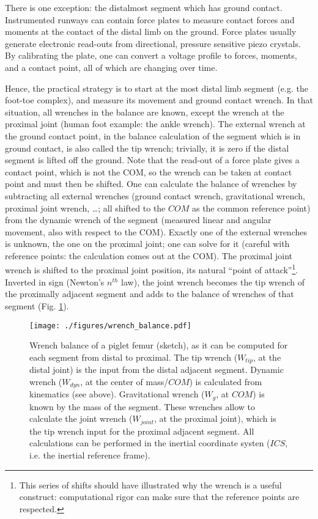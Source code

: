 There is one exception: the distalmost segment which has ground contact.
Instrumented runways can contain force plates to measure contact forces and moments at the contact of the distal limb on the ground.
Force plates usually generate electronic read-outs from directional, pressure sensitive piezo crystals.
By calibrating the plate, one can convert a voltage profile to forces, moments, and a contact point, all of which are changing over time.


Hence, the practical strategy \citep{Robertson2013,Lynch2017,Dumas2004} is to start at the most distal limb segment (e.g. the foot-toe complex), and measure its movement and ground contact wrench.
In that situation, all wrenches in the balance are known, except the wrench at the proximal joint (human foot example: the ankle wrench).
The external wrench at the ground contact point, in the balance calculation of the segment which is in ground contact, is also called the tip wrench; trivially, it is zero if the distal segment is lifted off the ground.
Note that the read-out of a force plate gives a contact point, which is not the COM, so the wrench can be taken at contact point and must then be shifted.
One can calculate the balance of wrenches by subtracting all external wrenches (ground contact wrench, gravitational wrench, proximal joint wrench, \ldots{}; all shifted to the \(COM\) as the common reference point) from the dynamic wrench of the segment (measured linear and angular movement, also with respect to the COM).
Exactly one of the external wrenches is unknown, the one on the proximal joint; one can solve for it (careful with reference points: the calculation comes out at the COM).
The proximal joint wrench is shifted to the proximal joint position, its natural ``point of attack''\footnote{This series of shifts should have illustrated why the wrench is a useful construct: computational rigor can make sure that the reference points are respected.}.
Inverted in sign (Newton's \(n^{th}\) law), the joint wrench becomes the tip wrench of the proximally adjacent segment and adds to the balance of wrenches of that segment (Fig. \ref{fig:wrenchbalance}).

\begin{figure}[p]
\centering
\texttt{[image: ./figures/wrench\_balance.pdf]}
\caption{\label{fig:wrenchbalance}Wrench balance of a piglet femur (sketch), as it can be computed for each segment from distal to proximal. The tip wrench (\(W_{tip}\), at the distal joint) is the input from the distal adjacent segment. Dynamic wrench (\(W_{dyn}\), at the center of mass/\(COM\)) is calculated from kinematics (see above). Gravitational wrench (\(W_{g}\), at \(COM\)) is known by the mass of the segment. These wrenches allow to calculate the joint wrench (\(W_{joint}\), at the proximal joint), which is the tip wrench input for the proximal adjacent segment. All calculations can be performed in the inertial coordinate systen (\(ICS\), i.e. the inertial reference frame).}
\end{figure}


